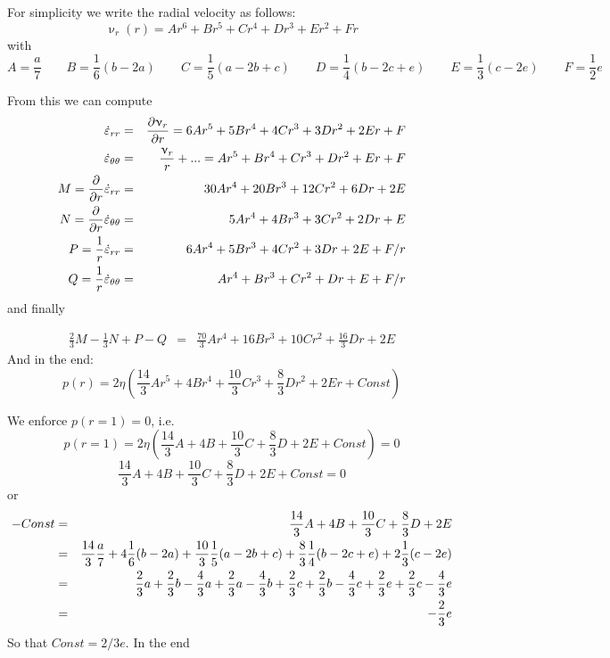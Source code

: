 For simplicity we write the radial velocity as follows:
\[
\upnu_r(r) = A  r^6 + B r^5 + C r^4 + D r^3 + E  r^2 + Fr
\]
with 
\[
A=\frac{a}{7}
\qquad
B=\frac16(b-2a)
\qquad
C=\frac15(a-2b+c)
\qquad
D=\frac14(b-2c+e)
\qquad
E=\frac13(c-2e)
\qquad
F=\frac{1}{2}e
\]



From this we can compute
\begin{eqnarray}
\dot\varepsilon_{rr} 
&=& \frac{\partial \upnu_r}{\partial r} 
=  6A  r^5 + 5B r^4 + 4C r^3 + 3D r^2 + 2E  r + F
\nonumber\\
\dot\varepsilon_{\theta\theta}
&=& \frac{\upnu_r}{r} + ... 
= A  r^5 + B r^4 + C r^3 + D r^2 + E  r + F
\nonumber\\
M = \frac{\partial }{\partial r}   \dot\varepsilon_{rr} 
&=& 30A  r^4 + 20B r^3 + 12C r^2 + 6D r + 2E    
\nonumber\\
N = \frac{\partial }{\partial r}  \dot\varepsilon_{\theta\theta} 
&=&  5A  r^4 + 4B r^3 + 3C r^2 + 2D r + E 
\nonumber\\
P=\frac{1}{r} \dot\varepsilon_{rr} 
&=&  6A  r^4 + 5B r^3 + 4C r^2 + 3D r + 2E  + F/r 
\nonumber\\
Q=\frac{1}{r}\dot\varepsilon_{\theta\theta}
&=& A  r^4 + B r^3 + C r^2 + D r + E  + F/r
\end{eqnarray}
and finally 


\begin{eqnarray}
\frac23 M - \frac13 N+P - Q 
&=& \frac{70}{3} A r^4 + 16 B r^3  + 10C r^2 + \frac{16}{3} Dr + 2E  
\end{eqnarray}
And in the end:
\[
p(r) = 2\eta \left(  \frac{14}{3} A r^5 + 4B r^4  + \frac{10}{3} C r^3 + \frac{8}{3}Dr^2 + 2Er + Const \right)
\]

We enforce $p(r=1)=0$, i.e.
\[
p(r=1) = 2\eta \left(  \frac{14}{3} A + 4B  + \frac{10}{3} C  + \frac{8}{3}D + 2E + Const \right) = 0
\]
\[
\frac{14}{3} A + 4B  + \frac{10}{3} C  + \frac{8}{3}D + 2E + Const = 0 
\]
or 
\begin{eqnarray}
-Const
&=& \frac{14}{3} A + 4B  + \frac{10}{3} C  + \frac{8}{3}D + 2E \nonumber\\
&=& \frac{14}{3} \frac{a}{7} + 4 \frac16(b-2a) 
+ \frac{10}{3} \frac15(a-2b+c)
+ \frac{8}{3}\frac14(b-2c+e)
+ 2\frac13(c-2e) \nonumber\\
&=& \frac23 a + \frac23 b - \frac43 a + \frac23a -\frac43 b + \frac23 c
+ \frac23 b  - \frac43 c +\frac23 e +\frac23 c -\frac43 e \nonumber\\
&=& -\frac23 e 
\end{eqnarray} 
So that $Const=2/3e$.
In the end



